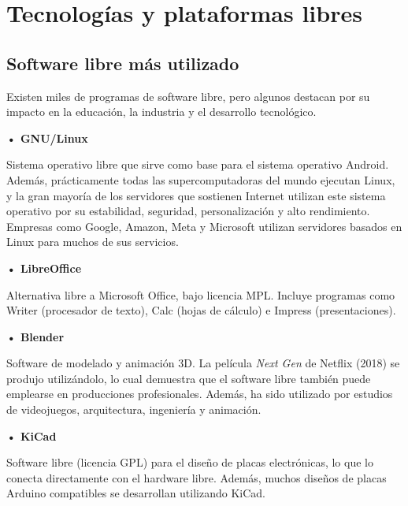 \documentclass[12pt]{article}
\begin{document}
	\section{Tecnologías y plataformas libres}
	\subsection{Software libre más utilizado}

    Existen miles de programas de software libre, pero algunos destacan por su impacto en la educación, la industria y el desarrollo tecnológico.

    \smallskip

    \hspace*{\parindent}\textbf{• GNU/Linux}

    Sistema operativo libre que sirve como base para el sistema operativo Android. Además, prácticamente todas las supercomputadoras del mundo ejecutan Linux, y la gran mayoría de los servidores que sostienen Internet utilizan este sistema operativo por su estabilidad, seguridad, personalización y alto rendimiento. Empresas como Google, Amazon, Meta y Microsoft utilizan servidores basados en Linux para muchos de sus servicios.

    \medskip

    \hspace*{\parindent}\textbf{• LibreOffice}

    Alternativa libre a Microsoft Office, bajo licencia MPL. Incluye programas como Writer (procesador de texto), Calc (hojas de cálculo) e Impress (presentaciones).

    \medskip

    \hspace*{\parindent}\textbf{• Blender}

    Software de modelado y animación 3D. La película \textit{Next Gen} de Netflix (2018) se produjo utilizándolo, lo cual demuestra que el software libre también puede emplearse en producciones profesionales. Además, ha sido utilizado por estudios de videojuegos, arquitectura, ingeniería y animación.

    \medskip

    \hspace*{\parindent}\textbf{• KiCad}

    Software libre (licencia GPL) para el diseño de placas electrónicas, lo que lo conecta directamente con el hardware libre. Además, muchos diseños de placas Arduino compatibles se desarrollan utilizando KiCad.
	
\end{document}
